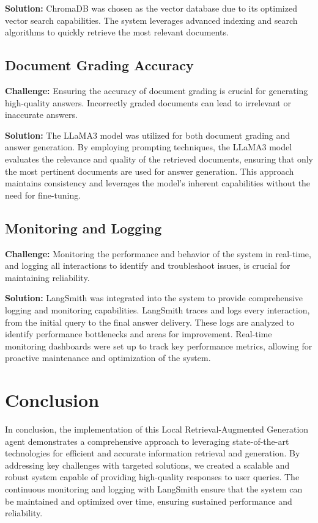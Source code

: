 \textbf{Solution:} ChromaDB was chosen as the vector database due to its optimized vector search capabilities. The system leverages advanced indexing and search algorithms to quickly retrieve the most relevant documents.

\subsection{Document Grading Accuracy}

\textbf{Challenge:} Ensuring the accuracy of document grading is crucial for generating high-quality answers. Incorrectly graded documents can lead to irrelevant or inaccurate answers.

\textbf{Solution:} The LLaMA3 model was utilized for both document grading and answer generation. By employing prompting techniques, the LLaMA3 model evaluates the relevance and quality of the retrieved documents, ensuring that only the most pertinent documents are used for answer generation. This approach maintains consistency and leverages the model's inherent capabilities without the need for fine-tuning.

\subsection{Monitoring and Logging}

\textbf{Challenge:} Monitoring the performance and behavior of the system in real-time, and logging all interactions to identify and troubleshoot issues, is crucial for maintaining reliability.

\textbf{Solution:} LangSmith was integrated into the system to provide comprehensive logging and monitoring capabilities. LangSmith traces and logs every interaction, from the initial query to the final answer delivery. These logs are analyzed to identify performance bottlenecks and areas for improvement. Real-time monitoring dashboards were set up to track key performance metrics, allowing for proactive maintenance and optimization of the system.

\section{Conclusion}

In conclusion, the implementation of this Local Retrieval-Augmented Generation agent demonstrates a comprehensive approach to leveraging state-of-the-art technologies for efficient and accurate information retrieval and generation. By addressing key challenges with targeted solutions, we created a scalable and robust system capable of providing high-quality responses to user queries. The continuous monitoring and logging with LangSmith ensure that the system can be maintained and optimized over time, ensuring sustained performance and reliability.
